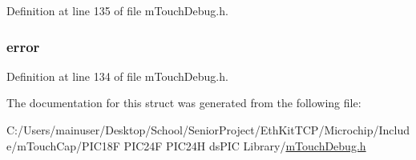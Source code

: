 Definition at line 135 of file m\+Touch\+Debug.\+h.

\hypertarget{structtag___d_e_b_u_g_c_u_r_r_e_n_t_a2c336ec489f664295b2020b126f23ed4}{}
\subsubsection[{error}]{ error}\label{structtag___d_e_b_u_g_c_u_r_r_e_n_t_a2c336ec489f664295b2020b126f23ed4}


Definition at line 134 of file m\+Touch\+Debug.\+h.



The documentation for this struct was generated from the following file\+:\begin{DoxyCompactItemize}
\item 
C\+:/\+Users/mainuser/\+Desktop/\+School/\+Senior\+Project/\+Eth\+Kit\+T\+C\+P/\+Microchip/\+Include/m\+Touch\+Cap/\+P\+I\+C18\+F P\+I\+C24\+F P\+I\+C24\+H ds\+P\+I\+C Library/\hyperlink{m_touch_debug_8h}{m\+Touch\+Debug.\+h}\end{DoxyCompactItemize}

